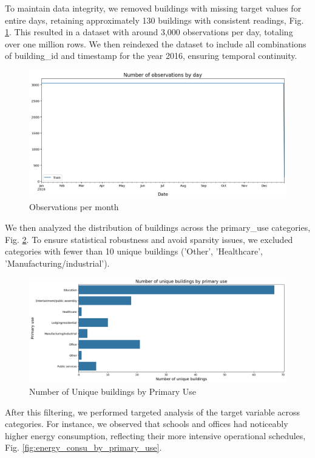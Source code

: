 To maintain data integrity, we removed buildings with missing target values for entire days, retaining approximately 130 buildings with consistent readings, Fig. \ref{fig:obs-by-month-good}. This resulted in a dataset with around 3,000 observations per day, totaling over one million rows. We then reindexed the dataset to include all combinations of building\_id and timestamp for the year 2016, ensuring temporal continuity.

\begin{figure}[!h]
    \centering
    \includegraphics[width=0.75\linewidth]{images/obser-good.png}
    \caption{Observations per month}
    \label{fig:obs-by-month-good}
\end{figure}

We then analyzed the distribution of buildings across the primary\_use categories, Fig. \ref{fig:primary_use_before_delete}. To ensure statistical robustness and avoid sparsity issues, we excluded categories with fewer than 10 unique buildings ('Other', 'Healthcare', 'Manufacturing/industrial'). 

\begin{figure}[!h]
    \centering
    \includegraphics[width=0.75\linewidth]{images/primary_use_after_deleting.png}
    \caption{Number of Unique buildings by Primary Use}
    \label{fig:primary_use_before_delete}
\end{figure}

After this filtering, we performed targeted analysis of the target variable across categories. For instance, we observed that schools and offices had noticeably higher energy consumption, reflecting their more intensive operational schedules, Fig. \ref{fig:energy_consu_by_primary_use}.

